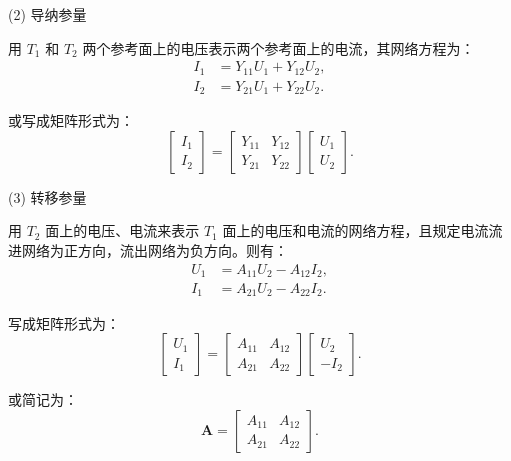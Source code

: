 (2) 导纳参量

用 $ T_1 $ 和 $ T_2 $ 两个参考面上的电压表示两个参考面上的电流，其网络方程为：
\begin{equation}
	\begin{aligned}
		I_1 &= Y_{11} U_1 + Y_{12} U_2, \\
		I_2 &= Y_{21} U_1 + Y_{22} U_2.
	\end{aligned}
	\tag{4-4-5a}
\end{equation}

或写成矩阵形式为：
\begin{equation}
	\begin{bmatrix}
		I_1 \\
		I_2
	\end{bmatrix}
	=
	\begin{bmatrix}
		Y_{11} & Y_{12} \\
		Y_{21} & Y_{22}
	\end{bmatrix}
	\begin{bmatrix}
		U_1 \\
		U_2
	\end{bmatrix}.
	\tag{4-4-5b}
\end{equation}

(3) 转移参量

用 $ T_2 $ 面上的电压、电流来表示 $ T_1 $ 面上的电压和电流的网络方程，且规定电流流进网络为正方向，流出网络为负方向。则有：
\begin{equation}
	\begin{aligned}
		U_1 &= A_{11} U_2 - A_{12} I_2, \\
		I_1 &= A_{21} U_2 - A_{22} I_2.
	\end{aligned}
	\tag{4-4-7a}
\end{equation}

写成矩阵形式为：
\begin{equation}
	\begin{bmatrix}
		U_1 \\
		I_1
	\end{bmatrix}
	=
	\begin{bmatrix}
		A_{11} & A_{12} \\
		A_{21} & A_{22}
	\end{bmatrix}
	\begin{bmatrix}
		U_2 \\
		-I_2
	\end{bmatrix}.
	\tag{4-4-7b}
\end{equation}

或简记为：
\[
\mathbf{A} =
\begin{bmatrix}
	A_{11} & A_{12} \\
	A_{21} & A_{22}
\end{bmatrix}.
\]

